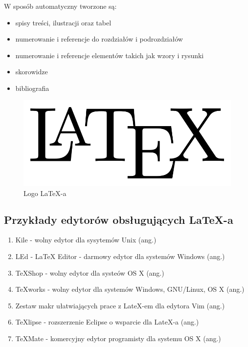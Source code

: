 \documentclass{article}
\begin{document}
W sposób automatyczny tworzone są: 
\begin{itemize}
\item spisy treści, ilustracji oraz tabel
\item numerowanie i referencje do rozdziałów i podrozdziałów
\item numerowanie i referencje elementów takich jak wzory i rysunki
\item skorowidze
\item bibliografia
\end{itemize}
\begin{figure}[h!]
\begin{center}
\includegraphics[width=\linewidth]{logo.png}
\caption{Logo LaTeX-a}
\label{Logo}
\end{center}
\end{figure}

\newpage
\subsection{Przykłady edytorów obsługujących LaTeX-a}
\begin{enumerate}
\item Kile - wolny edytor dla sysytemów Unix (ang.)
\item LEd - LaTeX Editor - darmowy edytor dla systemów Windows (ang.)
\item TeXShop - wolny edytor dla systeów OS X (ang.)
\item TeXworks - wolny edytor dla systemów Windows, GNU/Linux, OS X (ang.)
\item Zestaw makr ułatwiających prace z LateX-em dla edytora Vim (ang.)
\item TeXlipse - rozszerzenie Eclipse\cite{trzeci} o wsparcie dla LateX-a (ang.)
\item TeXMate - komercyjny edytor programisty dla systemu OS X (ang.)
\end{enumerate}
\end{document}
